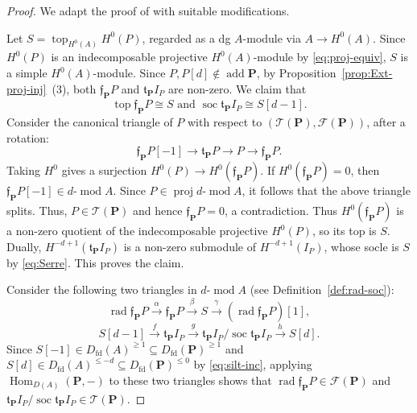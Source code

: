 \documentclass[11pt,a4paper,reqno]{amsart}
\theoremstyle{plain}
\numberwithin{equation}{section}
\theoremstyle{definition}
\providecommand{\add}{\operatorname{add}}
\renewcommand{\mod}{\operatorname{mod}}
\newcommand{\Hom}{\operatorname{Hom}}
\newcommand{\Proj}{\operatorname{proj}}
\newcommand{\emod}[2]{#1\text{-}\!\mod #2}
\newcommand{\PP}{\mathbf{P}}
\newcommand{\T}{\mathcal{T}}
\newcommand{\F}{\mathcal{F}}
\begin{document}
\begin{proof}
We adapt the proof of \cite[Corollary~5.3]{BZ} with suitable modifications.

Let $S=\operatorname{top}_{H^0(A)}H^0(P)$, regarded as a dg $A$-module via $A\to H^0(A)$. Since $H^0(P)$ is an indecomposable projective $H^0(A)$-module by \eqref{eq:proj-equiv}, $S$ is a simple $H^0(A)$-module. Since $P,P[d]\notin\add\PP$, by Proposition~\ref{prop:Ext-proj-inj}~(3), both $\mathfrak{f}_{\PP}P$ and $\mathfrak{t}_{\PP}I_P$ are non-zero. We claim that
\[
 \operatorname{top}\mathfrak{f}_{\PP}P\cong S\text{ and } \operatorname{soc}\mathfrak{t}_{\PP}I_P\cong S[d-1].
\]
Consider the canonical triangle of $P$ with respect to $(\T(\PP),\F(\PP))$, after a rotation:
\[\mathfrak{f}_{\PP}P[-1]\to \mathfrak{t}_{\PP}P\to P\to \mathfrak{f}_{\PP}P.\]
Taking $H^0$ gives a surjection $H^0(P)\to H^0(\mathfrak{f}_{\PP}P)$. If $H^0(\mathfrak{f}_{\PP}P)=0$, then $\mathfrak{f}_{\PP}P[-1]\in\emod{d}{A}$. Since $P\in\Proj\emod{d}{A}$, it follows that the above triangle splits. Thus,  $P\in\T(\PP)$ and hence $\mathfrak{f}_{\PP}P=0$, a contradiction. Thus $H^0(\mathfrak{f}_{\PP}P)$ is a non-zero quotient of the indecomposable projective $H^0(P)$, so its top is $S$. Dually, $H^{-d+1}(\mathfrak{t}_{\PP}I_P)$ is a non-zero
submodule of $H^{-d+1}(I_P)$, whose socle is $S$ by
\eqref{eq:Serre}. This proves the claim.

Consider the following two triangles in $\emod{d}{A}$ (see Definition~\ref{def:rad-soc}):
\[
  \operatorname{rad}\mathfrak{f}_{\PP}P\xrightarrow{\alpha}\mathfrak{f}_{\PP}P\xrightarrow{\beta}S\xrightarrow{\gamma}(\operatorname{rad}\mathfrak{f}_{\PP}P)[1],
\]
\[
  S[d-1]\xrightarrow{f}\mathfrak{t}_{\PP}I_P\xrightarrow{g}\mathfrak{t}_{\PP}I_P/\operatorname{soc}\mathfrak{t}_{\PP}I_P\xrightarrow{h} S[d].
\]
Since $S[-1]\in D_{\mathrm{fd}}(A)^{\geq 1}\subseteq D_{\mathrm{fd}}(\PP)^{\geq1}$ and $S[d]\in D_{\mathrm{fd}}(A)^{\leq -d}\subseteq D_{\mathrm{fd}}(\PP)^{\leq0}$ by \eqref{eq:silt-inc}, applying $\Hom_{D(A)}(\PP,-)$ to these two triangles shows that $\operatorname{rad}\mathfrak{f}_{\PP}P\in\F(\PP)$ and $\mathfrak{t}_{\PP}I_P/\operatorname{soc}\mathfrak{t}_{\PP}I_P\in\T(\PP)$. 


\end{proof}
\end{document}
